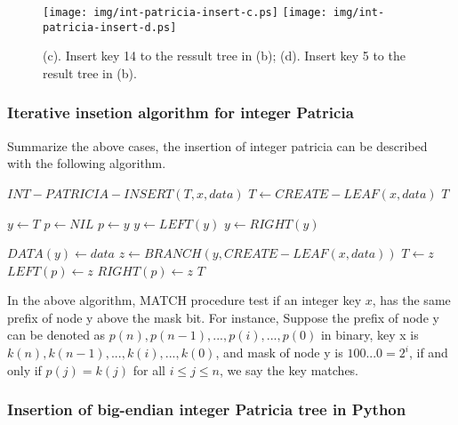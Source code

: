 \documentclass{article}
\begin{document}
\begin{figure}[htbp]
       \begin{center}
	\texttt{[image: img/int-patricia-insert-c.ps]}
	\texttt{[image: img/int-patricia-insert-d.ps]}
        \caption{(c). Insert key 14 to the ressult tree in (b);
	(d). Insert key 5 to the result tree in (b).}
        \label{fig:int-patricia-insert-c}
       \end{center}
\end{figure}

\subsubsection{Iterative insetion algorithm for integer Patricia}

Summarize the above cases, the insertion of integer patricia can be described
with the following algorithm.

\begin{algorithmic}
\STATE $INT-PATRICIA-INSERT(T, x, data)$
   \STATE $T \leftarrow CREATE-LEAF(x, data)$
   \RETURN $T$
\ENDIF

\STATE $y \leftarrow T$
\STATE $p \leftarrow NIL$
  \STATE $p \leftarrow y$
    \STATE $y \leftarrow LEFT(y)$
  \ELSE
    \STATE $y \leftarrow RIGHT(y)$
  \ENDIF
\ENDWHILE

  \STATE $DATA(y) \leftarrow data$ 
\ELSE
  \STATE $z \leftarrow BRANCH(y, CREATE-LEAF(x, data))$
    \STATE $T \leftarrow z$
  \ELSE
      \STATE $LEFT(p) \leftarrow z$
    \ELSE
      \STATE $RIGHT(p) \leftarrow z$
    \ENDIF
  \ENDIF
\ENDIF
\RETURN $T$
\end{algorithmic}

In the above algorithm, MATCH procedure test if an integer key $x$, has 
the same prefix of node y above the mask bit. For instance,
Suppose the prefix of node y can be denoted as 
$p(n), p(n-1), ..., p(i), ..., p(0)$ in binary, key x is
$k(n), k(n-1), ..., k(i), ..., k(0)$, and mask of node y is 
$100...0=2^i$, if and only if $p(j)=k(j)$ for all $i \leq j \leq n$, 
we say the key matches.

\subsubsection*{Insertion of big-endian integer Patricia tree in Python}
\end{document}
